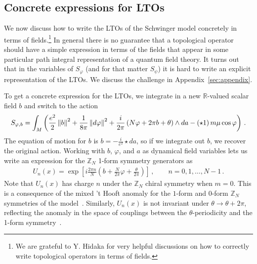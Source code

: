 \documentclass[11pt]{article}
\newcommand{\formabs}[1]{\left\Arrowvert #1 \right\Arrowvert}
\begin{document}
\subsection{Concrete expressions for LTOs}

We now discuss how to write the LTOs of the Schwinger model concretely in terms of fields.\footnote{We are grateful to Y. Hidaka for very helpful discussions on how to correctly write topological operators in terms of fields.} In general there is no guarantee that  a topological operator should have a simple expression in terms of the fields that appear in some particular path integral representation of a quantum field theory.  It turns out that in the variables of $S_\varphi$ (and for that matter $S_{\psi}$) it is hard to write an explicit representation of the LTOs.   We discuss the challenge in Appendix~\ref{sec:appendix}.



To get a concrete expression for the LTOs, we integrate in a new $\mathbb{R}$-valued scalar field $b$ and switch to the action
\begin{align}
     S_{\varphi,b}=\int_M \left( \frac{e^2}{2} \formabs{b}^2+\frac{1}{8\pi} \formabs{d\varphi}^2+\frac{i}{2\pi} \left(N \varphi + 2\pi b + \theta \right)\wedge da - (\star 1)\,m\mu\cos\varphi \right) \, .
     \label{eq:action_b_field}
\end{align}
The equation of motion for $b$ is $b = - \frac{i}{e^2} \star  da$, so if we integrate out $b$,  we recover the original action.   Working with $b$, $\varphi$, and $a$ as dynamical field variables lets us write an expression for the $\mathbb{Z}_N$  1-form symmetry generators as
\begin{align}
    U_n(x)=\exp \left[ i\frac{2\pi n}{N} \left(b +\frac{N}{2\pi}\varphi + \frac{\theta}{2\pi}\right) \right] \,, \qquad n = 0,1,\ldots, N-1 \,.
\label{eq:U_n_Schwinger}
\end{align}
Note that $U_n(x)$ has charge $n$ under the $\mathbb{Z}_N$ chiral symmetry when $m=0$.  This is a consequence of the mixed 't Hooft anomaly for the $1$-form and $0$-form $\mathbb{Z}_N$ symmetries of the model~\cite{Anber:2018jdf}. Similarly, $U_n(x)$ is not invariant under $\theta \to \theta + 2\pi$, reflecting the anomaly in the space of couplings between the $\theta$-periodicity and the 1-form symmetry~\cite{Cordova:2019jnf,Cordova:2019uob}. 
\end{document}
